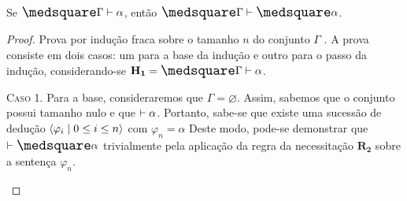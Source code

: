     \begin{theorem}\label{gen-nec}
        Se $\nec\Gamma\entails\alpha$, então $\nec\Gamma\entails\nec\alpha$.

        \begin{proof}
            Prova por indução fraca sobre o tamanho $n$ do conjunto $\Gamma$ \citep{Troelstra}. A prova consiste em dois casos: um para a base da indução e outro para o passo da indução, considerando-se $\mathbf{H_1}=\nec\Gamma\entails\alpha$.

            \begin{case}
                \textsc{Caso 1.} Para a base, consideraremos que $\Gamma=\varnothing$.
                Assim, sabemos que o conjunto possui tamanho nulo e que $\mathrel{\vdash}\alpha$. Portanto, sabe-se que existe uma sucessão de dedução $\langle\varphi_i\mid 0\leq i\leq n\rangle$ com $\varphi_n=\alpha$
                Deste modo, pode-se demonstrar que $\entails\nec\alpha$ trivialmente pela aplicação da regra da necessitação \hyperref[necessitation]{$\mathbf{R_2}$} sobre a sentença $\varphi_n$.
            \end{case}


\end{proof}
\end{theorem}
